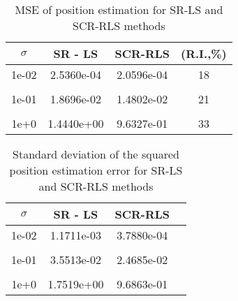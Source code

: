 
\begin{table*}[h]
\centering
\caption{MSE of position estimation for SR-LS and SCR-RLS methods}
\phantom{m}
\begin{tabular}{|c|c|c|c|} \hline
\centering
$\sigma$ & SR - LS & SCR-RLS & (R.I.,\%)  \\ \hline
1e-02&	2.5360e-04 & 2.0596e-04 &  18 \\ &&&\\
1e-01&	1.8696e-02  & 1.4802e-02 & 21   \\ &&&\\
1e+0&	1.4440e+00 & 9.6327e-01 &  33   \\ %
\hline
\end{tabular}
\label{tab:scr_rls}
\end{table*}


\newpage

\begin{table*}[h]
\centering
\caption{Standard deviation of the squared position estimation error for SR-LS and SCR-RLS methods}
\phantom{m}
\begin{tabular}{|c|c|c|c|} \hline
\centering
$\sigma$ & SR - LS & SCR-RLS  \\ \hline
1e-02&	1.1711e-03  & 3.7880e-04  \\ &&\\
1e-01&	3.5513e-02 & 2.4685e-02    \\ &&\\
1e+0&	1.7519e+00  & 9.6863e-01   \\ %
\hline
\end{tabular}
\label{tab:rls}
\end{table*}

